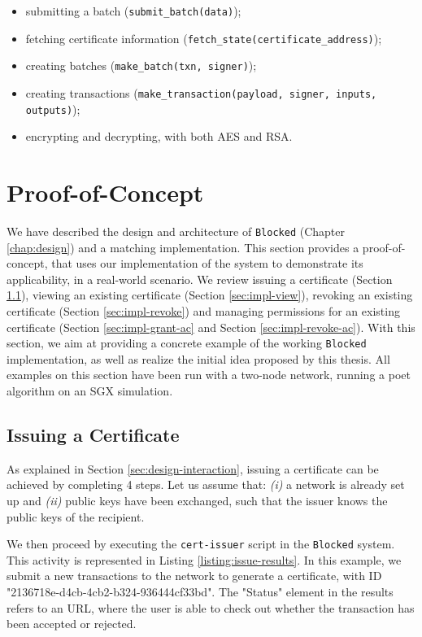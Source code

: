 \begin{itemize}
	\item submitting a batch (\texttt{submit\_batch(data)});
	\item fetching certificate information (\texttt{fetch\_state(certificate\_address)});
	\item creating batches (\texttt{make\_batch(txn, signer)});
	\item creating transactions (\texttt{make\_transaction(payload, signer, inputs, outputs)});
	\item encrypting and decrypting, with both AES and RSA.
\end{itemize}

\section{Proof-of-Concept}
\label{sec:implementation-poc}

We have described the design and architecture of \texttt{Blocked} (Chapter \ref{chap:design}) and a matching implementation. This section provides a proof-of-concept, that uses our implementation of the system to demonstrate its applicability, in a real-world scenario. We review issuing a certificate (Section \ref{sec:impl-issue}), viewing an existing certificate (Section \ref{sec:impl-view}), revoking an existing certificate (Section \ref{sec:impl-revoke}) and managing permissions for an existing certificate (Section \ref{sec:impl-grant-ac} and Section \ref{sec:impl-revoke-ac}). With this section, we aim at providing a concrete example of the working \texttt{Blocked} implementation, as well as realize the initial idea proposed by this thesis. All examples on this section have been run with a two-node network, running a \gls{poet} algorithm on an SGX simulation.

\subsection{Issuing a Certificate}
\label{sec:impl-issue}

As explained in Section \ref{sec:design-interaction}, issuing a certificate can be achieved by completing 4 steps. Let us assume that: \emph{(i)} a network is already set up and \emph{(ii)} public keys have been exchanged, such that the issuer knows the public keys of the recipient.

We then proceed by executing the \texttt{cert-issuer} script in the \texttt{Blocked} system. This activity is represented in Listing \ref{listing:issue-results}. In this example, we submit a new transactions to the network to generate a certificate, with ID "2136718e-d4cb-4cb2-b324-936444cf33bd". The "Status" element in the results refers to an URL, where the user is able to check out whether the transaction has been accepted or rejected.


